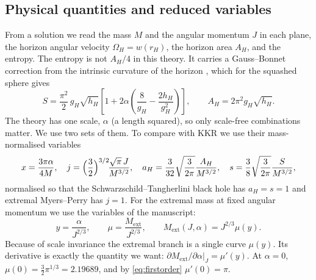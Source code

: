 \documentclass[11pt,a4paper]{article}
\newcommand{\ext}{\mathrm{ext}}
\begin{document}
\subsection{Physical quantities and reduced variables}

From a solution we read the mass $M$ and the angular momentum $J$ in each plane,
the horizon angular velocity $\Omega_H=w(r_H)$, the horizon area $A_H$, and the
entropy. The entropy is not $A_H/4$ in this theory. It carries a Gauss--Bonnet
correction from the intrinsic curvature of the horizon \cite{JacobsonMyers1993},
which for the squashed sphere gives
\begin{equation}
  S=\frac{\pi^2}{2}\,g_H\sqrt{h_H}\left[1+2\alpha\left(\frac{8}{g_H}
  -\frac{2h_H}{g_H^2}\right)\right],\qquad A_H=2\pi^2 g_H\sqrt{h_H}.
\end{equation}
The theory has one scale, $\alpha$ (a length squared), so only scale-free
combinations matter. We use two sets of them. To compare with KKR we use their
mass-normalised variables
\begin{equation}
  x=\frac{3\pi\alpha}{4M},\quad
  j=\Bigl(\frac32\Bigr)^{3/2}\!\frac{\sqrt\pi\,J}{M^{3/2}},\quad
  a_H=\frac{3}{32}\sqrt{\frac{3}{2\pi}}\frac{A_H}{M^{3/2}},\quad
  s=\frac38\sqrt{\frac{3}{2\pi}}\frac{S}{M^{3/2}},
\end{equation}
normalised so that the Schwarzschild--Tangherlini black hole has
$a_H=s=1$ and extremal Myers--Perry has $j=1$. For the extremal mass at fixed
angular momentum we use the variables of the manuscript:
\begin{equation}
  y=\frac{\alpha}{J^{2/3}},\qquad \mu=\frac{M_\ext}{J^{2/3}},\qquad
  M_\ext(J,\alpha)=J^{2/3}\mu(y).
  \label{eq:scaling}
\end{equation}
Because of scale invariance the extremal branch is a single curve $\mu(y)$. Its
derivative is exactly the quantity we want:
$\partial M_\ext/\partial\alpha|_J=\mu'(y)$. At $\alpha=0$,
$\mu(0)=\tfrac32\pi^{1/3}=2.19689$, and by \eqref{eq:firstorder}
$\mu'(0)=\pi$.
\end{document}
